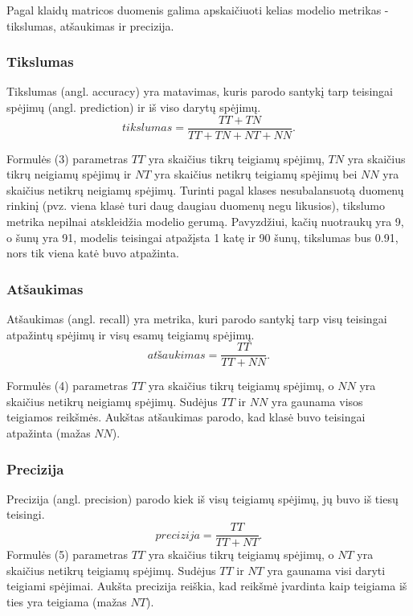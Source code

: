 \documentclass{VUMIFPSbakalaurinis}
\begin{document}
Pagal klaidų matricos duomenis galima apskaičiuoti kelias modelio metrikas - tikslumas, atšaukimas ir precizija.

\subsubsection{Tikslumas}
Tikslumas (angl. accuracy) yra matavimas, kuris parodo santykį tarp teisingai spėjimų (angl. prediction) ir iš viso darytų spėjimų.
\begin{equation}
tikslumas = \frac{TT + TN}{TT + TN + NT + NN}.
\end{equation}

Formulės (3) parametras \(TT\) yra skaičius tikrų teigiamų spėjimų, \(TN\) yra skaičius tikrų neigiamų spėjimų ir \(NT\) yra skaičius netikrų teigiamų spėjimų bei \(NN\) yra skaičius netikrų neigiamų spėjimų.
Turinti pagal klases nesubalansuotą duomenų rinkinį (pvz. viena klasė turi daug daugiau duomenų negu likusios), tikslumo metrika nepilnai atskleidžia modelio gerumą. Pavyzdžiui, kačių nuotraukų yra 9, o šunų yra 91, modelis teisingai atpažįsta 1 katę ir 90 šunų, tikslumas bus 0.91, nors tik viena katė buvo atpažinta. 

\subsubsection{Atšaukimas}
Atšaukimas (angl. recall) yra metrika, kuri parodo santykį tarp visų teisingai atpažintų spėjimų ir visų esamų teigiamų spėjimų.
\begin{equation}
atšaukimas = \frac{TT}{TT + NN}.
\end{equation}

Formulės (4) parametras \(TT\) yra skaičius tikrų teigiamų spėjimų, o \(NN\) yra skaičius netikrų neigiamų spėjimų. Sudėjus \(TT\) ir \(NN\) yra gaunama visos teigiamos reikšmės.
Aukštas atšaukimas parodo, kad klasė buvo teisingai atpažinta (mažas \(NN\)).

\subsubsection{Precizija}
Precizija (angl. precision) parodo kiek iš visų teigiamų spėjimų, jų buvo iš tiesų teisingi. 
\begin{equation}
precizija = \frac{TT}{TT + NT}.
\end{equation}
Formulės (5) parametras \(TT\) yra skaičius tikrų teigiamų spėjimų, o \(NT\) yra skaičius netikrų teigiamų spėjimų. Sudėjus \(TT\) ir \(NT\) yra gaunama visi daryti teigiami spėjimai.
Aukšta precizija reiškia, kad reikšmė įvardinta kaip teigiama iš ties yra teigiama (mažas \(NT\)).
\end{document}
